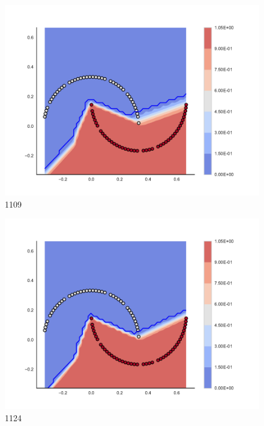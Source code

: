 \begin{subfigure}[b]{0.09\textwidth}
    \includegraphics[clip, trim=2.35cm 1.75cm 4.5cm 0cm,width=\textwidth]{img/convergence/1109.pdf}
    \caption{1109}
    \label{fig:convergence_1109}
\end{subfigure}
%
\begin{subfigure}[b]{0.09\textwidth}
    \includegraphics[clip, trim=2.35cm 1.75cm 4.5cm 0cm,width=\textwidth]{img/convergence/1124.pdf}
    \caption{1124}
    \label{fig:convergence_1124}
\end{subfigure}
%
